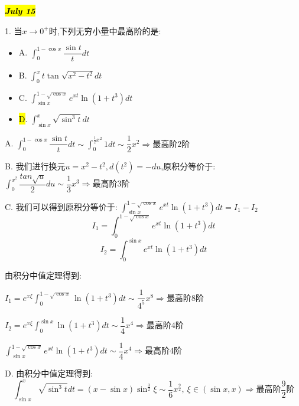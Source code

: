 \hl{\textbf{\textit{July 15}}}

1. 当$x\rightarrow 0^{+}$时,下列无穷小量中最高阶的是: 
\begin{itemize}
	\item A. $\int_{0}^{1-\cos x}\dfrac{\sin t}{t}dt$
	\item B. $\int_{0}^{x}t\tan \sqrt{x^2-t^2}dt$
	\item C. $\int_{\sin x}^{1-\sqrt{\cos x}}e^{xt}\ln(1+t^3)dt$
	\item \hl{D}. $\int_{\sin x}^{x}\sqrt{\sin^3 t}dt$
\end{itemize}
\begin{solution}
	
	A. $\int_{0}^{1-\cos x}\dfrac{\sin t}{t}dt\sim \int_{0}^{\frac{1}{2}x^2}1dt\sim \dfrac{1}{2}x^2\Rightarrow \text{最高阶} 2\text{阶}$
	
	B. 我们进行换元$u=x^2-t^2,d(t^2)=-du$,原积分等价于: $\int_{0}^{x^2}\dfrac{tan \sqrt{u}}{2}du\sim \dfrac{1}{3}x^3\Rightarrow \text{最高阶} 3\text{阶}$
	
	C. 我们可以得到原积分等价于: $\int_{\sin x}^{1-\sqrt{\cos x}}e^{xt}\ln(1+t^3)dt=I_{1}-I_{2}$
	$$I_{1}=\int_{0}^{1-\sqrt{\cos x}}e^{xt}\ln(1+t^3)dt$$
	$$I_{2}=\int_{0}^{\sin x}e^{xt}\ln(1+t^3)dt$$
	
	由积分中值定理得到: 
	
	$I_{1}=e^{x\xi}\int_{0}^{1-\sqrt{\cos x}}\ln(1+t^3)dt\sim \dfrac{1}{4^5}x^8\Rightarrow \text{最高阶} 8\text{阶}$
	
	$I_{2}=e^{x\xi}\int_{0}^{\sin x}\ln(1+t^3)dt\sim \dfrac{1}{4}x^4\Rightarrow \text{最高阶} 4\text{阶}$
	
	$\int_{\sin x}^{1-\sqrt{\cos x}}e^{xt}\ln(1+t^3)dt\sim\dfrac{1}{4}x^4\Rightarrow \text{最高阶} 4\text{阶}$
	
	D. 由积分中值定理得到: 
	$$\int_{\sin x}^{x}\sqrt{\sin^3 t}dt=(x-\sin x)\sin^{\frac{3}{2}}\xi\sim \dfrac{1}{6}x^{\frac{9}{2}},\ \xi\in(\sin x,x)\Rightarrow \text{最高阶} \dfrac{9}{2}\text{阶}$$
\end{solution}

